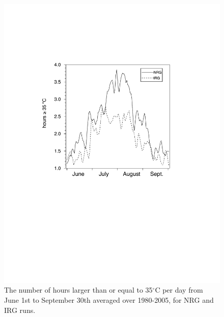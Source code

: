 \documentclass[draft,ms]{agutex}   %
\begin{document}
\begin{figure}
\begin{center}
\includegraphics[width=6in]{irrig_hours_T2>=35.pdf}
\caption{The number of hours larger than or equal to 35$^\circ$C per day from June 1st to September 30th averaged over 1980-2005, for NRG and IRG runs.}
\label{fig:Figure 6}
\end{center}
\end{figure}
\end{document}
